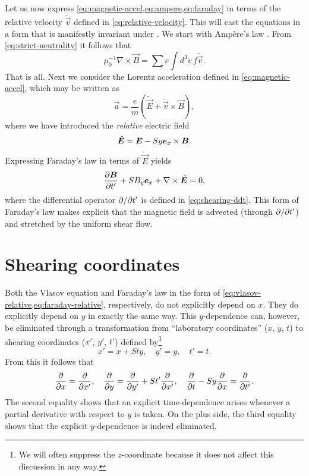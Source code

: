 \documentclass[aps,pre,notitlepage,amsmath,amssymb,amsfonts,nobibnotes,nofootinbib,superscriptaddress,onecolumn,a4paper,10pt]{revtex4-1}
\newcommand{\tvec}[1]{\tilde{\vec{#1}}}
\begin{document}
Let us now express \cref{eq:magnetic-accel,eq:ampere,eq:faraday} in terms of
the relative velocity $\tvec{v}$ defined in \cref{eq:relative-velocity}. This
will cast the equations in a form that is manifestly invariant under
. We start with Ampère's law
. From \cref{eq:strict-neutrality} it follows that
\begin{equation}
  \mu_0^{-1}\nabla\times\vec{B} = \sum e\int\!d^3v\,f\tvec{v}.
\end{equation}
That is all. Next we consider the Lorentz acceleration defined in
\cref{eq:magnetic-accel}, which may be written as
\begin{equation}
  \vec{a} = \frac{e}{m}(\tvec{E} + \tvec{v}\times\vec{B}),
\end{equation}
where we have introduced the \emph{relative} electric field
\begin{equation}
  \tvec{E} = \vec{E} - Sy\ex\times\vec{B}.
\end{equation}
Expressing Faraday's law  in terms of $\tvec{E}$ yields
\begin{equation}
  \label{eq:faraday-relative}
  \pder{\vec{B}}{t'} + SB_y\ex + \nabla\times\tvec{E} = 0,
\end{equation}
where the differential operator $\partial{}/\partial{t'}$ is defined in
\cref{eq:shearing-ddt}. This form of Faraday's law makes explicit that the
magnetic field is advected (through $\partial{}/\partial{t'}$) and stretched by the
uniform shear flow.

\section{Shearing coordinates}\label{sec:shearing-coordinates}

Both the Vlasov equation and Faraday's law in the form of
\cref{eq:vlasov-relative,eq:faraday-relative}, respectively, do not explicitly
depend on $x$. They do explicitly depend on $y$ in exactly the same way. This
$y$-dependence can, however, be eliminated through a transformation from
``laboratory coordinates'' ($x$, $y$, $t$) to shearing coordinates ($x'$,
$y'$, $t'$) defined by\footnote{We will often suppress the $z$-coordinate
  because it does not affect this discussion in any way.}
\begin{equation}
  \label{eq:shearing-coordinates}
  x' = x + Sty,\quad y' = y,\quad t' = t.
\end{equation}
From this it follows that
\begin{equation}
  \frac{\partial}{\partial x} = \frac{\partial}{\partial x'},\quad
  \frac{\partial}{\partial y} = \frac{\partial}{\partial y'} + St'\frac{\partial}{\partial x'},\quad
  \frac{\partial}{\partial t} - Sy\frac{\partial}{\partial x} = \frac{\partial}{\partial t'}.
\end{equation}
The second equality shows that an explicit time-dependence arises whenever a
partial derivative with respect to $y$ is taken. On the plus side, the third
equality shows that the explicit $y$-dependence is indeed eliminated.
\end{document}
